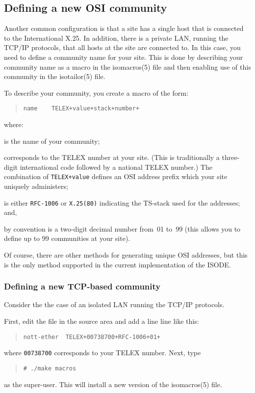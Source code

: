 \subsection	{Defining a new OSI community}
Another common configuration is that a site has a single host that is
connected to the International X.25.
In addition,
there is a private LAN,
running the TCP/IP protocols,
that all hosts at the site are connected to.
In this case,
you need to define a community name for your site.
This is done by describing your community name as a macro in the
\man isomacros(5) file and then enabling use of this community in the
\man isotailor(5) file.

To describe your community,
you create a macro of the form:
\begin{quote}\small\begin{verbatim}
name    TELEX+value+stack+number+
\end{verbatim}\end{quote}
where:
\begin{describe}
\item[\verb"name":] is the name of your community;

\item[\verb"value":] corresponds to the TELEX number at your site.
(This is traditionally a three-digit international code followed by a
national TELEX number.)
The combination of \verb"TELEX+value" defines an OSI address prefix which your
site uniquely administers;

\item[\verb"stack":] is either \verb"RFC-1006" or \verb"X.25(80)" indicating
the TS-stack used for the addresses;
and,

\item[\verb"number":] by convention is a two-digit decimal number from~01
to~99 (this allows you to define up to 99 communities at your site).
\end{describe}
Of course,
there are other methods for generating unique OSI addresses,
but this is the only method supported in the current implementation of the
ISODE.

\subsubsection	{Defining a new TCP-based community}
Consider the the case of an isolated LAN running the TCP/IP protocols.

First,
edit the file  in the source area and add a line 
line like this: 
\begin{quote}\small\begin{verbatim}
nott-ether	TELEX+00738700+RFC-1006+01+
\end{verbatim}\end{quote}
where \verb"00738700" corresponds to your TELEX number.
Next,
type
\begin{quote}\small\begin{verbatim}
# ./make macros
\end{verbatim}\end{quote}
as the super-user.
This will install a new version of the \man isomacros(5) file.

